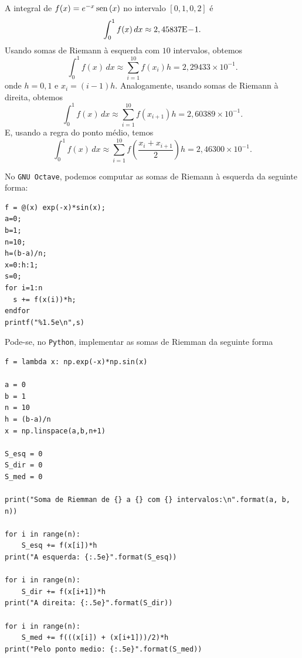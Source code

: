 \begin{ex}
  A integral de $f(x) = e^{-x}\operatorname{sen}\,(x)$ no intervalo $[0,1, 0,2]$ é
  \begin{equation}
    \int_{0}^{1} f(x)\,dx \approx 2,45837\mathrm{E}\!-\!1.
  \end{equation}
Usando somas de Riemann à esquerda com $10$ intervalos, obtemos
\begin{equation}
  \int_0^1 f(x)\,dx \approx \sum_{i=1}^{10} f(x_{i})h = 2,29433\times 10^{-1}.
\end{equation}
onde $h=0,1$ e $x_i=(i-1)h$. Analogamente, usando somas de Riemann à direita, obtemos
\begin{equation}
  \int_0^1 f(x)\,dx \approx \sum_{i=1}^{10} f(x_{i+1})h = 2,60389\times 10^{-1}.
\end{equation}
E, usando a regra do ponto médio, temos
\begin{equation}
  \int_0^1 f(x)\,dx \approx \sum_{i=1}^{10} f\left(\frac{x_i+x_{i+1}}{2}\right)h = 2,46300\times 10^{-1}.
\end{equation}

\ifisscilab
\construirScilab
\fi
\ifisoctave
No \verb+GNU Octave+, podemos computar as somas de Riemann à esquerda da seguinte forma:
\begin{verbatim}
f = @(x) exp(-x)*sin(x);
a=0;
b=1;
n=10;
h=(b-a)/n;
x=0:h:1;
s=0;
for i=1:n
  s += f(x(i))*h;
endfor
printf("%1.5e\n",s)
\end{verbatim}
\fi
\ifispython
Pode-se, no \verb+Python+, implementar as somas de Riemman da seguinte forma
\begin{verbatim}
f = lambda x: np.exp(-x)*np.sin(x)

a = 0
b = 1
n = 10
h = (b-a)/n
x = np.linspace(a,b,n+1)

S_esq = 0
S_dir = 0
S_med = 0

print("Soma de Riemman de {} a {} com {} intervalos:\n".format(a, b, n))

for i in range(n):
    S_esq += f(x[i])*h
print("A esquerda: {:.5e}".format(S_esq))

for i in range(n):
    S_dir += f(x[i+1])*h
print("A direita: {:.5e}".format(S_dir))

for i in range(n):
    S_med += f(((x[i]) + (x[i+1]))/2)*h
print("Pelo ponto medio: {:.5e}".format(S_med))
\end{verbatim}
\fi
\end{ex}

